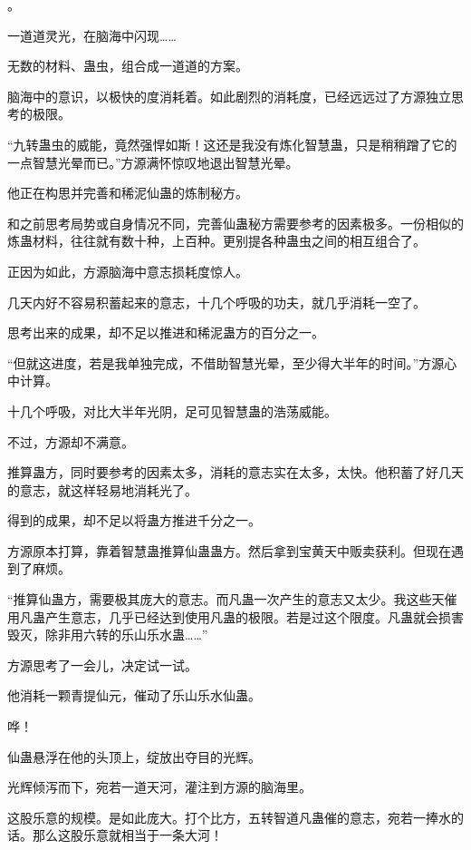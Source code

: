 
\begin{this_body}



。

一道道灵光，在脑海中闪现……

无数的材料、蛊虫，组合成一道道的方案。

脑海中的意识，以极快的度消耗着。如此剧烈的消耗度，已经远远过了方源独立思考的极限。

“九转蛊虫的威能，竟然强悍如斯！这还是我没有炼化智慧蛊，只是稍稍蹭了它的一点智慧光晕而已。”方源满怀惊叹地退出智慧光晕。

他正在构思并完善和稀泥仙蛊的炼制秘方。

和之前思考局势或自身情况不同，完善仙蛊秘方需要参考的因素极多。一份相似的炼蛊材料，往往就有数十种，上百种。更别提各种蛊虫之间的相互组合了。

正因为如此，方源脑海中意志损耗度惊人。

几天内好不容易积蓄起来的意志，十几个呼吸的功夫，就几乎消耗一空了。

思考出来的成果，却不足以推进和稀泥蛊方的百分之一。

“但就这进度，若是我单独完成，不借助智慧光晕，至少得大半年的时间。”方源心中计算。

十几个呼吸，对比大半年光阴，足可见智慧蛊的浩荡威能。

不过，方源却不满意。

推算蛊方，同时要参考的因素太多，消耗的意志实在太多，太快。他积蓄了好几天的意志，就这样轻易地消耗光了。

得到的成果，却不足以将蛊方推进千分之一。

方源原本打算，靠着智慧蛊推算仙蛊蛊方。然后拿到宝黄天中贩卖获利。但现在遇到了麻烦。

“推算仙蛊方，需要极其庞大的意志。而凡蛊一次产生的意志又太少。我这些天催用凡蛊产生意志，几乎已经达到使用凡蛊的极限。若是过这个限度。凡蛊就会损害毁灭，除非用六转的乐山乐水蛊……”

方源思考了一会儿，决定试一试。

他消耗一颗青提仙元，催动了乐山乐水仙蛊。

哗！

仙蛊悬浮在他的头顶上，绽放出夺目的光辉。

光辉倾泻而下，宛若一道天河，灌注到方源的脑海里。

这股乐意的规模。是如此庞大。打个比方，五转智道凡蛊催的意志，宛若一捧水的话。那么这股乐意就相当于一条大河！


\end{this_body}
